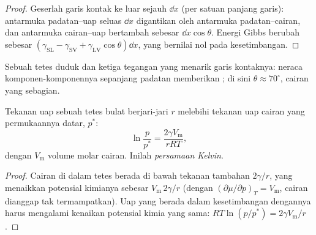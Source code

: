 \begin{proof}
Geserlah garis kontak ke luar sejauh $\dd x$ (per satuan panjang garis): antarmuka padatan--uap
seluas $\dd x$ digantikan oleh antarmuka padatan--cairan, dan antarmuka
cairan--uap bertambah sebesar $\dd x\cos\theta$. Energi Gibbs berubah sebesar
$(\gamma_{\mathrm{SL}} - \gamma_{\mathrm{SV}} + \gamma_{\mathrm{LV}}\cos\theta)\dd x$, yang bernilai nol pada kesetimbangan.
\end{proof}

\begin{omfigure}

{\small Sebuah tetes duduk dan ketiga tegangan yang menarik garis kontaknya:
neraca komponen-komponennya sepanjang padatan memberikan ; di
sini $\theta
\approx 70^\circ$, cairan yang  sebagian.}
\end{omfigure}

\begin{theorem}\label{thm:b3:colloids:kelvin}
Tekanan uap sebuah tetes bulat berjari-jari $r$ melebihi tekanan uap cairan
yang permukaannya datar, $p^*$:
\[
  \ln\frac{p}{p^*} = \frac{2\gamma V_{\mathrm m}}{rRT},
\]
dengan $V_{\mathrm m}$ volume molar cairan. Inilah \emph{persamaan
Kelvin}.
\end{theorem}

\begin{proof}
Cairan di dalam tetes berada di bawah tekanan tambahan $2\gamma/r$, yang menaikkan
potensial kimianya sebesar $V_{\mathrm m}\,2\gamma/r$ (dengan $(\partial\mu/\partial p)_T = V_{\mathrm m}$, cairan dianggap tak termampatkan).
Uap yang berada dalam kesetimbangan dengannya harus mengalami kenaikan
potensial kimia yang sama: $RT\ln(p/p^*) = 2\gamma V_{\mathrm m}/r$.
\end{proof}


